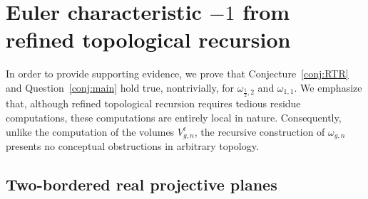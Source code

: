 \documentclass[12pt]{amsart}
\theoremstyle{plain}
\theoremstyle{definition}
\theoremstyle{remark}
\numberwithin{equation}{section}
\begin{document}












\section{Euler characteristic $-1$ from refined topological recursion}\label{sec:evidence}
In order to provide supporting evidence, we prove that Conjecture~\ref{conj:RTR} and Question~\ref{conj:main} hold true, nontrivially,  for $\omega_{\frac12,2}$ and $\omega_{1,1}$. We emphasize that, although refined topological recursion requires tedious residue computations, these computations are entirely local in nature. Consequently, unlike the computation of the volumes $V_{g,n}^{\epsilon}$, the recursive construction of $\omega_{g,n}$ presents no conceptual obstructions in arbitrary topology.



\subsection{Two-bordered real projective planes}
\end{document}
